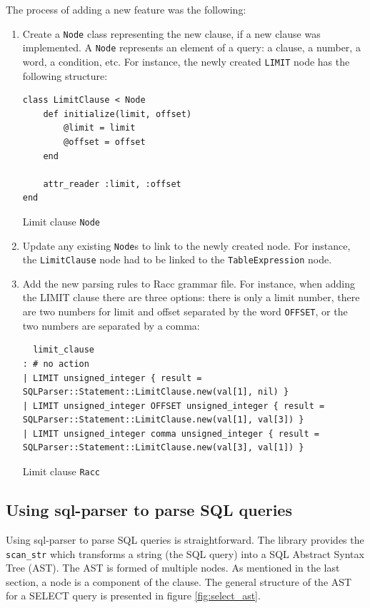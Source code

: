 The process of adding a new feature was the following:
\begin{enumerate}
    \item Create a \texttt{Node} class representing the new clause, if a new clause was implemented. A \texttt{Node} represents an element of a query: a clause, a number, a word, a condition, etc. For instance, the newly created \texttt{LIMIT} node has the following structure:
\begin{code}
\begin{verbatim}
class LimitClause < Node
    def initialize(limit, offset)
        @limit = limit
        @offset = offset
    end

    attr_reader :limit, :offset
end
\end{verbatim}
\caption{Limit clause \texttt{Node}}
\label{fig:limit_clause}
\end{code}
    \item Update any existing \texttt{Node}s to link to the newly created node. For instance, the \texttt{LimitClause} node had to be linked to the \texttt{TableExpression} node.
    \item Add the new parsing rules to Racc grammar file. For instance, when adding the LIMIT clause there are three options: there is only a limit number, there are two numbers for limit and offset separated by the word \texttt{OFFSET}, or the two numbers are separated by a comma:
    
\begin{code}
    \centering
    \begin{verbatim}
  limit_clause
: # no action
| LIMIT unsigned_integer { result = SQLParser::Statement::LimitClause.new(val[1], nil) }
| LIMIT unsigned_integer OFFSET unsigned_integer { result = SQLParser::Statement::LimitClause.new(val[1], val[3]) }
| LIMIT unsigned_integer comma unsigned_integer { result = SQLParser::Statement::LimitClause.new(val[3], val[1]) }
    \end{verbatim}
    \caption{Limit clause \texttt{Racc}}
    \label{fig:limit_clause_racc}
\end{code}
\end{enumerate}

\subsection{Using sql-parser to parse SQL queries}
Using sql-parser to parse SQL queries is straightforward. The library provides the \texttt{scan_str} which transforms a string (the SQL query) into a SQL Abstract Syntax Tree (AST). The AST is formed of multiple nodes. As mentioned in the last section, a node is a component of the clause. The general structure of the AST for a SELECT query is presented in figure \ref{fig:select_ast}.

